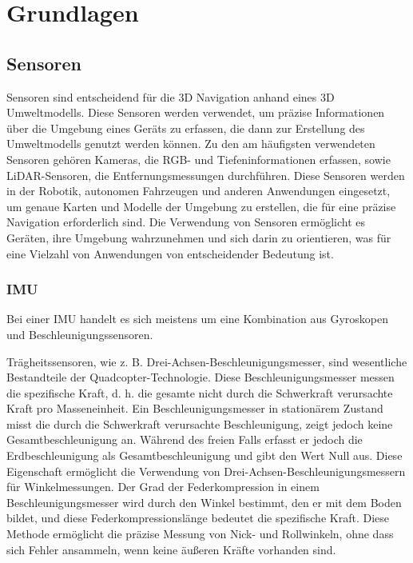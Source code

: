 \chapter{Grundlagen}

\section{Sensoren} \label{sensoren:section}

Sensoren sind entscheidend für die 3D Navigation anhand eines 3D Umweltmodells. Diese Sensoren werden verwendet, um präzise Informationen über die Umgebung eines Geräts zu erfassen, die dann zur Erstellung des Umweltmodells genutzt werden können. Zu den am häufigsten verwendeten Sensoren gehören Kameras, die RGB- und Tiefeninformationen erfassen, sowie LiDAR-Sensoren, die Entfernungsmessungen durchführen. Diese Sensoren werden in der Robotik, autonomen Fahrzeugen und anderen Anwendungen eingesetzt, um genaue Karten und Modelle der Umgebung zu erstellen, die für eine präzise Navigation erforderlich sind. Die Verwendung von Sensoren ermöglicht es Geräten, ihre Umgebung wahrzunehmen und sich darin zu orientieren, was für eine Vielzahl von Anwendungen von entscheidender Bedeutung ist.

    \subsection{IMU}
        Bei einer \ac{IMU} handelt es sich meistens um eine Kombination aus Gyroskopen und Beschleunigungssensoren.

        Trägheitssensoren, wie z. B. Drei-Achsen-Beschleunigungsmesser, sind wesentliche Bestandteile der Quadcopter-Technologie. Diese Beschleunigungsmesser messen die spezifische Kraft, d. h. die gesamte nicht durch die Schwerkraft verursachte Kraft pro Masseneinheit. Ein Beschleunigungsmesser in stationärem Zustand misst die durch die Schwerkraft verursachte Beschleunigung, zeigt jedoch keine Gesamtbeschleunigung an. Während des freien Falls erfasst er jedoch die Erdbeschleunigung als Gesamtbeschleunigung und gibt den Wert Null aus. Diese Eigenschaft ermöglicht die Verwendung von Drei-Achsen-Beschleunigungsmessern für Winkelmessungen. Der Grad der Federkompression in einem Beschleunigungsmesser wird durch den Winkel bestimmt, den er mit dem Boden bildet, und diese Federkompressionslänge bedeutet die spezifische Kraft. Diese Methode ermöglicht die präzise Messung von Nick- und Rollwinkeln, ohne dass sich Fehler ansammeln, wenn keine äußeren Kräfte vorhanden sind.

